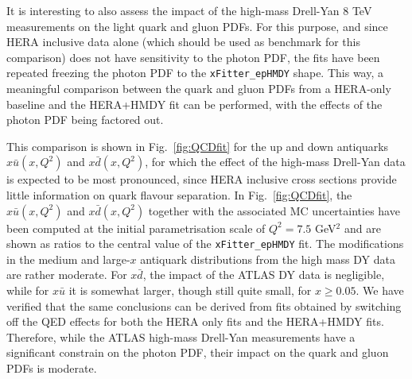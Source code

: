 It is interesting to also assess the impact of the high-mass Drell-Yan 8 TeV measurements on
the light quark and gluon PDFs.
%
For this purpose, and since HERA inclusive data alone (which should be used as
benchmark for this comparison) does not have sensitivity to the photon
PDF, the fits have been repeated freezing the photon PDF to the
{\tt xFitter\_epHMDY} shape.
%
This way, 
a meaningful comparison between the quark and gluon PDFs
from a HERA-only
baseline and the HERA+HMDY fit can be performed, with the effects of
the photon PDF being factored out.

This comparison is shown in Fig.~\ref{fig:QCDfit} for the up and down
antiquarks $x\bar{u}(x,Q^2)$ and $x\bar{d}(x,Q^2)$, for which the effect of the high-mass Drell-Yan data is
expected to be most pronounced, since HERA inclusive cross sections
provide little information on quark flavour separation.
%
In Fig.~\ref{fig:QCDfit}, the $x\bar{u}(x,Q^2)$ and $x\bar{d}(x,Q^2)$ together
with the associated MC uncertainties have been computed
at the initial parametrisation scale of $Q^2=7.5$ GeV$^2$ and
are shown as ratios to the central value of the {\tt xFitter\_epHMDY}
fit.
%
The modifications in the medium
and large-$x$ antiquark distributions from the high mass DY data are
rather moderate.
%
For $x\bar{d}$, the impact of the ATLAS DY data is negligible, while
for $x\bar{u}$ it is somewhat larger, though still quite small,
for $x\ge 0.05$.
%
We have verified that the same conclusions can be derived
from fits obtained by switching
off the QED effects for both the HERA only fits and the HERA+HMDY fits.
%
Therefore, while the ATLAS high-mass Drell-Yan measurements have a significant constrain
on the photon PDF, their impact on the quark and gluon PDFs is moderate.

